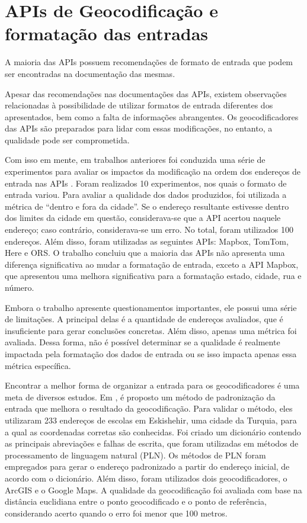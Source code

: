 \section{APIs de Geocodificação e  formatação das entradas}

A maioria das APIs possuem recomendações de formato de entrada que podem ser encontradas na documentação das mesmas. 

Apesar das recomendações nas documentações das APIs, existem observações relacionadas à possibilidade de utilizar formatos de entrada diferentes dos apresentados, bem como a falta de informações abrangentes. Os geocodificadores das APIs são preparados para lidar com essas modificações, no entanto, a qualidade pode ser comprometida.

Com isso em mente, em trabalhos anteriores \cite{terralab} foi conduzida uma série de experimentos para avaliar os impactos da modificação na ordem dos endereços de entrada nas APIs \cite{relatorioDeA}. Foram realizados 10 experimentos, nos quais o formato de entrada variou. Para avaliar a qualidade dos dados produzidos, foi utilizada a métrica de ``dentro e fora da cidade''. Se o endereço resultante estivesse dentro dos limites da cidade em questão, considerava-se que a API acertou naquele endereço; caso contrário, considerava-se um erro. No total, foram utilizados 100 endereços. Além disso, foram utilizadas as seguintes APIs: Mapbox, TomTom, Here e ORS. O trabalho concluiu que a maioria das APIs não apresenta uma diferença significativa ao mudar a formatação de entrada, exceto a API Mapbox, que apresentou uma melhora significativa para a formatação estado, cidade, rua e número.

Embora o trabalho apresente questionamentos importantes, ele possui uma série de limitações. A principal delas é a quantidade de endereços avaliados, que é insuficiente para gerar conclusões concretas. Além disso, apenas uma métrica foi avaliada. Dessa forma, não é possível determinar se a qualidade é realmente impactada pela formatação dos dados de entrada ou se isso impacta apenas essa métrica específica.
 
Encontrar a melhor forma de organizar a entrada para os geocodificadores é uma meta de diversos estudos. Em \cite{KUCUKMATCI2018}, é proposto um método de padronização da entrada que melhora o resultado da geocodificação. Para validar o método, eles utilizaram 233 endereços de escolas em Eskishehir, uma cidade da Turquia, para a qual as coordenadas corretas são conhecidas. Foi criado um dicionário contendo as principais abreviações e falhas de escrita, que foram utilizadas em métodos de processamento de linguagem natural (PLN). Os métodos de PLN foram empregados para gerar o endereço padronizado a partir do endereço inicial, de acordo com o dicionário. Além disso, foram utilizados dois geocodificadores, o ArcGIS e o Google Maps. A qualidade da geocodificação foi avaliada com base na distância euclidiana entre o ponto geocodificado e o ponto de referência, considerando acerto quando o erro foi menor que 100 metros.


